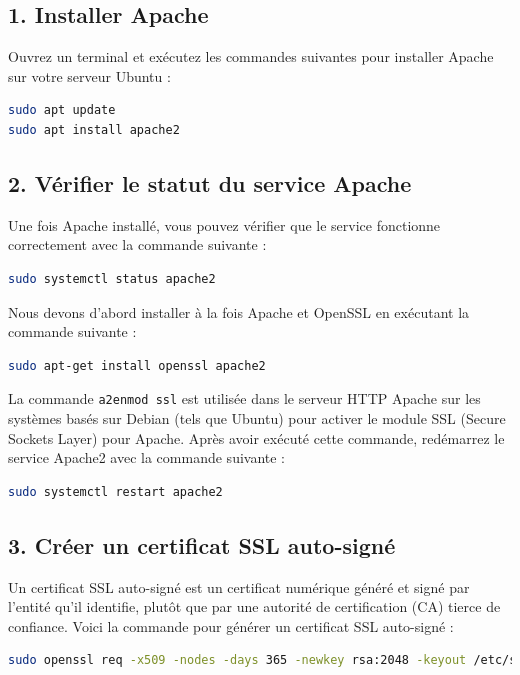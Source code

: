 \subsection*{1. Installer Apache}
Ouvrez un terminal et exécutez les commandes suivantes pour installer Apache sur votre serveur Ubuntu :

\begin{lstlisting}[language=bash]
sudo apt update
sudo apt install apache2
\end{lstlisting}

\subsection*{2. Vérifier le statut du service Apache}
Une fois Apache installé, vous pouvez vérifier que le service fonctionne correctement avec la commande suivante :

\begin{lstlisting}[language=bash]
sudo systemctl status apache2
\end{lstlisting}

Nous devons d’abord installer à la fois Apache et OpenSSL en exécutant la commande suivante :
\begin{lstlisting}[language=bash]
sudo apt-get install openssl apache2
\end{lstlisting}

La commande \texttt{a2enmod ssl} est utilisée dans le serveur HTTP Apache sur les systèmes basés sur Debian (tels que Ubuntu) pour activer le module SSL (Secure Sockets Layer) pour Apache. Après avoir exécuté cette commande, redémarrez le service Apache2 avec la commande suivante :

\begin{lstlisting}[language=bash]
sudo systemctl restart apache2
\end{lstlisting}

\subsection*{3. Créer un certificat SSL auto-signé}
Un certificat SSL auto-signé est un certificat numérique généré et signé par l'entité qu'il identifie, plutôt que par une autorité de certification (CA) tierce de confiance. Voici la commande pour générer un certificat SSL auto-signé :

\begin{lstlisting}[language=bash]
sudo openssl req -x509 -nodes -days 365 -newkey rsa:2048 -keyout /etc/ssl/private/private.key -out /etc/ssl/certs/certificate.crt
\end{lstlisting}

